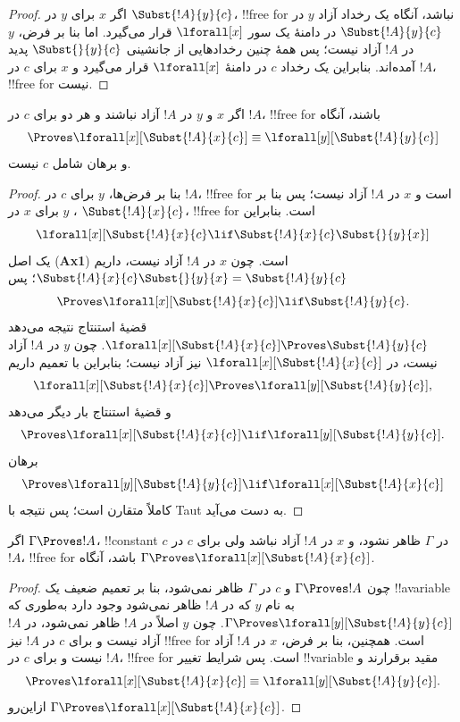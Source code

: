 \documentclass[../../../include/open-logic-section]{subfiles}
\begin{document}
\begin{proof}
اگر $x$ برای $y$ در $\Subst{!A}{y}{c}$، !!{free for} نباشد، آنگاه
یک رخداد آزاد $y$ در $\Subst{!A}{y}{c}$ در دامنهٔ یک سور
$\lforall[x]$ قرار می‌گیرد. اما بنا بر فرض، $y$ در $!A$ آزاد نیست؛ پس
همهٔ چنین رخدادهایی از جانشینی $\Subst{}{y}{c}$ پدید آمده‌اند.
بنابراین یک رخداد $c$ در دامنهٔ $\lforall[x]$ قرار می‌گیرد و $x$ برای
$c$ در $!A$، !!{free for} نیست.
\end{proof}

\begin{lem}
اگر $x$ و $y$ در $!A$ آزاد نباشند و هر دو برای $c$ در $!A$،
!!{free for} باشند، آنگاه
\[
\Proves \lforall[x][\Subst{!A}{x}{c}] \equiv
\lforall[y][\Subst{!A}{y}{c}]
\]
و برهان شامل $c$ نیست.
\end{lem}

\begin{proof}
بنا بر فرض‌ها، $y$ برای $c$ در $!A$، !!{free for} است و $x$ در
$!A$ آزاد نیست؛ پس بنا بر ، $y$ برای $x$ در
$\Subst{!A}{x}{c}$، !!{free for} است. بنابراین
\[
\lforall[x][\Subst{!A}{x}{c} \lif
\Subst{!A}{x}{c} \Subst{}{y}{x}]
\]
یک اصل (\textbf{Ax1}) است. چون $x$ در $!A$ آزاد نیست، داریم
$\Subst{!A}{x}{c}\Subst{}{y}{x}=\Subst{!A}{y}{c}$؛ پس
\[
\Proves \lforall[x][\Subst{!A}{x}{c}] \lif \Subst{!A}{y}{c}.
\]
قضیهٔ استنتاج نتیجه می‌دهد
$\lforall[x][\Subst{!A}{x}{c}]\Proves\Subst{!A}{y}{c}$.
چون $y$ در $!A$ آزاد نیست، در
$\lforall[x][\Subst{!A}{x}{c}]$ نیز آزاد نیست؛ بنابراین با تعمیم داریم
\[
\lforall[x][\Subst{!A}{x}{c}]
\Proves \lforall[y][\Subst{!A}{y}{c}],
\]
و قضیهٔ استنتاج بار دیگر می‌دهد
\[
\Proves
\lforall[x][\Subst{!A}{x}{c}]
\lif
\lforall[y][\Subst{!A}{y}{c}].
\]
برهان
\[
\Proves
\lforall[y][\Subst{!A}{y}{c}]
\lif
\lforall[x][\Subst{!A}{x}{c}]
\]
کاملاً متقارن است؛ پس نتیجه با Taut به دست می‌آید.
\end{proof}

\begin{thm}
اگر $\Gamma\Proves !A$، !!{constant} $c$ در $\Gamma$ ظاهر نشود، و
$x$ در $!A$ آزاد نباشد ولی برای $c$ در $!A$، !!{free for} باشد،
آنگاه
$\Gamma\Proves\lforall[x][\Subst{!A}{x}{c}]$.
\end{thm}

\begin{proof}
چون $\Gamma\Proves !A$ و $c$ در $\Gamma$ ظاهر نمی‌شود، بنا بر تعمیم
ضعیف یک !!a{variable} به نام $y$ که در $!A$ ظاهر نمی‌شود وجود دارد
به‌طوری که
$\Gamma\Proves\lforall[y][\Subst{!A}{y}{c}]$.
چون $y$ اصلاً در $!A$ ظاهر نمی‌شود، در $!A$ آزاد نیست و برای $c$ در
$!A$ نیز !!{free for} است. همچنین، بنا بر فرض، $x$ در $!A$ آزاد نیست
و برای $c$ در $!A$، !!{free for} است. پس شرایط تغییر !!{variable}
مقید برقرارند و
\[
\Proves \lforall[x][\Subst{!A}{x}{c}] \equiv
\lforall[y][\Subst{!A}{y}{c}].
\]
ازاین‌رو
$\Gamma\Proves\lforall[x][\Subst{!A}{x}{c}]$.
\end{proof}
\end{document}
